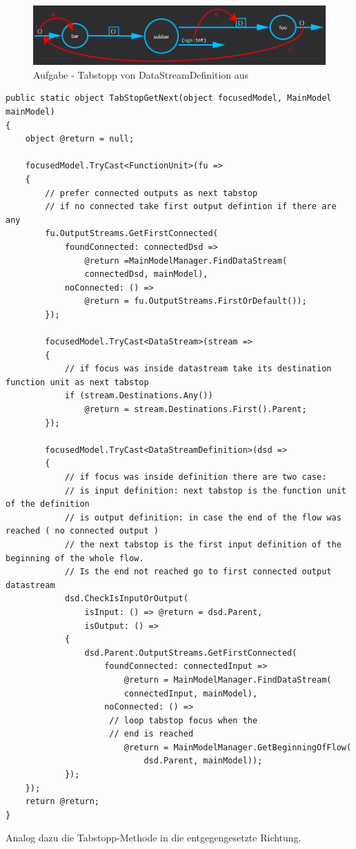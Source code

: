 \begin{enumerate}
	
	\begin{figure}[H]
		\centering
		\includegraphics[width=\linewidth]{./img/tabstop_datastreamdefiniton.png}
		\caption{Aufgabe - Tabstopp von DataStreamDefinition aus}
	\end{figure}
	
	\begin{lstlisting}[caption=Tabstopp vorwärts]
public static object TabStopGetNext(object focusedModel, MainModel mainModel)
{
	object @return = null;
	
	focusedModel.TryCast<FunctionUnit>(fu =>
	{
		// prefer connected outputs as next tabstop
		// if no connected take first output defintion if there are any
		fu.OutputStreams.GetFirstConnected(
			foundConnected: connectedDsd => 
				@return =MainModelManager.FindDataStream(
				connectedDsd, mainModel),
			noConnected: () => 
				@return = fu.OutputStreams.FirstOrDefault());
		});
		
		focusedModel.TryCast<DataStream>(stream =>
		{
			// if focus was inside datastream take its destination function unit as next tabstop
			if (stream.Destinations.Any())
				@return = stream.Destinations.First().Parent;
		});
		
		focusedModel.TryCast<DataStreamDefinition>(dsd =>
		{
			// if focus was inside definition there are two case:
			// is input definition: next tabstop is the function unit of the definition
			// is output definition: in case the end of the flow was reached ( no connected output ) 
			// the next tabstop is the first input definition of the beginning of the whole flow.
			// Is the end not reached go to first connected output datastream
			dsd.CheckIsInputOrOutput( 
				isInput: () => @return = dsd.Parent,
				isOutput: () =>
			{
				dsd.Parent.OutputStreams.GetFirstConnected(
					foundConnected: connectedInput => 
						@return = MainModelManager.FindDataStream(
						connectedInput, mainModel),
					noConnected: () =>
					 // loop tabstop focus when the 
					 // end is reached
						@return = MainModelManager.GetBeginningOfFlow(
							dsd.Parent, mainModel)); 
			});
	});
	return @return;
}

\end{lstlisting}
	Analog dazu die Tabstopp-Methode in die entgegengesetzte Richtung.
	

\end{enumerate}
